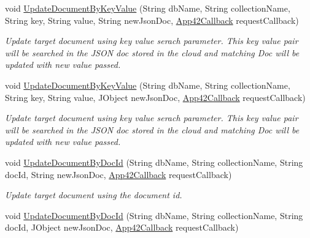 \begin{DoxyCompactItemize}
void \hyperlink{classcom_1_1shephertz_1_1app42_1_1paas_1_1sdk_1_1windows_1_1storage_1_1_storage_service_a6972846a403540d9df31caeca2547508}{Update\+Document\+By\+Key\+Value} (String db\+Name, String collection\+Name, String key, String value, String new\+Json\+Doc, \hyperlink{interfacecom_1_1shephertz_1_1app42_1_1paas_1_1sdk_1_1windows_1_1_app42_callback}{App42\+Callback} request\+Callback)
\begin{DoxyCompactList}\small\item\em Update target document using key value serach parameter. This key value pair will be searched in the J\+S\+O\+N doc stored in the cloud and matching Doc will be updated with new value passed. \end{DoxyCompactList}\item 
void \hyperlink{classcom_1_1shephertz_1_1app42_1_1paas_1_1sdk_1_1windows_1_1storage_1_1_storage_service_a0b8aa8ae64a60003ead47e71434507e0}{Update\+Document\+By\+Key\+Value} (String db\+Name, String collection\+Name, String key, String value, J\+Object new\+Json\+Doc, \hyperlink{interfacecom_1_1shephertz_1_1app42_1_1paas_1_1sdk_1_1windows_1_1_app42_callback}{App42\+Callback} request\+Callback)
\begin{DoxyCompactList}\small\item\em Update target document using key value serach parameter. This key value pair will be searched in the J\+S\+O\+N doc stored in the cloud and matching Doc will be updated with new value passed. \end{DoxyCompactList}\item 
void \hyperlink{classcom_1_1shephertz_1_1app42_1_1paas_1_1sdk_1_1windows_1_1storage_1_1_storage_service_acc41f2e6eef6da1ec7511269a6915118}{Update\+Document\+By\+Doc\+Id} (String db\+Name, String collection\+Name, String doc\+Id, String new\+Json\+Doc, \hyperlink{interfacecom_1_1shephertz_1_1app42_1_1paas_1_1sdk_1_1windows_1_1_app42_callback}{App42\+Callback} request\+Callback)
\begin{DoxyCompactList}\small\item\em Update target document using the document id. \end{DoxyCompactList}\item 
void \hyperlink{classcom_1_1shephertz_1_1app42_1_1paas_1_1sdk_1_1windows_1_1storage_1_1_storage_service_aa6c7645b44dbc08fd8662308df220305}{Update\+Document\+By\+Doc\+Id} (String db\+Name, String collection\+Name, String doc\+Id, J\+Object new\+Json\+Doc, \hyperlink{interfacecom_1_1shephertz_1_1app42_1_1paas_1_1sdk_1_1windows_1_1_app42_callback}{App42\+Callback} request\+Callback)

\end{DoxyCompactItemize}
